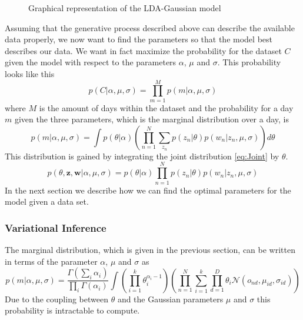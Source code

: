 \documentclass[a4paper,fleqn]{article}
\begin{document}
\begin{figure}[h!]
\centering
\def\svgwidth{0.8\textwidth}

\caption{Graphical representation of the LDA-Gaussian model}
\label{fig:modelExt}
\end{figure}




  
Assuming that the generative process described above can describe the available data properly, we now want to find the parameters so that the model best describes our data. We want in fact maximize the probability for the dataset $C$ given the model with respect to the parameters $\alpha$, $\mu$ and $\sigma$. This probability looks like this
\begin{equation}
p(C|\alpha,\mu,\sigma) = \prod_{m=1}^M p(m|\alpha,\mu,\sigma)
\end{equation}
where $M$ is the amount of days within the dataset and the probability for a day $m$ given the three parameters, which is the marginal distribution over a day, is
\begin{equation} 
p(m|\alpha,\mu,\sigma) = \int p(\theta|\alpha)  \left( \prod_{n=1}^N \sum_{z_n} p(z_n|\theta) p(w_n|z_n, \mu,\sigma)  \right) d\theta
\end{equation}
This distribution is gained by integrating the joint distribution \ref{eq:Joint} by $\theta$.
\begin{equation} \label{eq:Joint}
 p(\theta,\textbf{z},\textbf{w}|\alpha,\mu,\sigma) = p(\theta|\alpha) \prod_{n=1}^N p(z_n|\theta) p(w_n|z_n,\mu,\sigma)
\end{equation}
In the next section we describe how we can find the optimal parameters for the model given a data set.


  
\subsubsection{Variational Inference}
 
The marginal distribution, which is given in the previous section, can be written in terms of the parameter $\alpha$, $\mu$ and $\sigma$ as
  \begin{equation}
   p(m|\alpha,\mu,\sigma) = \frac{\Gamma (\sum_i \alpha_i)}{\prod_i \Gamma(\alpha_i)} \int \left( \prod_{i=1}^k \theta_i^{\alpha_i-1} \right)
   \left( \prod_{n=1}^N \sum_{i=1}^k \prod_{d=1}^D \theta_i \mathcal{N}(o_{nd},\mu_{id},\sigma_{id} ) \right)
  \end{equation}
Due to the coupling between $\theta$ and the Gaussian parameters $\mu$ and $\sigma$ this probability is intractable to compute.	
\end{document}
